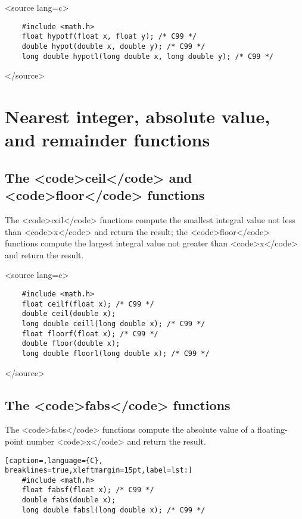 \textless{}source lang=c\textgreater{}
\begin{verbatim}
	#include <math.h>
	float hypotf(float x, float y); /* C99 */
	double hypot(double x, double y); /* C99 */
	long double hypotl(long double x, long double y); /* C99 */
\end{verbatim}
\textless{}/source\textgreater{}

\section{Nearest integer, absolute value, and remainder functions}

\subsection{The \textless{}code\textgreater{}ceil\textless{}/code\textgreater{} and \textless{}code\textgreater{}floor\textless{}/code\textgreater{} functions}

The \textless{}code\textgreater{}ceil\textless{}/code\textgreater{} functions compute the smallest integral value not less than \textless{}code\textgreater{}x\textless{}/code\textgreater{} and return the result; the \textless{}code\textgreater{}floor\textless{}/code\textgreater{} functions compute the largest integral value not greater than \textless{}code\textgreater{}x\textless{}/code\textgreater{} and return the result.

\textless{}source lang=c\textgreater{}
\begin{verbatim}
	#include <math.h>
	float ceilf(float x); /* C99 */
	double ceil(double x);
	long double ceill(long double x); /* C99 */
	float floorf(float x); /* C99 */
	double floor(double x);
	long double floorl(long double x); /* C99 */
\end{verbatim}
\textless{}/source\textgreater{}

\subsection{The \textless{}code\textgreater{}fabs\textless{}/code\textgreater{} functions}

The \textless{}code\textgreater{}fabs\textless{}/code\textgreater{} functions compute the absolute value of a floating-point number \textless{}code\textgreater{}x\textless{}/code\textgreater{} and return the result.

\lstset{basicstyle=\scriptsize, numbers=left, captionpos=b, tabsize=4}
\begin{lstlisting}[caption=,language={C},
breaklines=true,xleftmargin=15pt,label=lst:]
	#include <math.h>
	float fabsf(float x); /* C99 */
	double fabs(double x); 
	long double fabsl(long double x); /* C99 */
\end{lstlisting}

